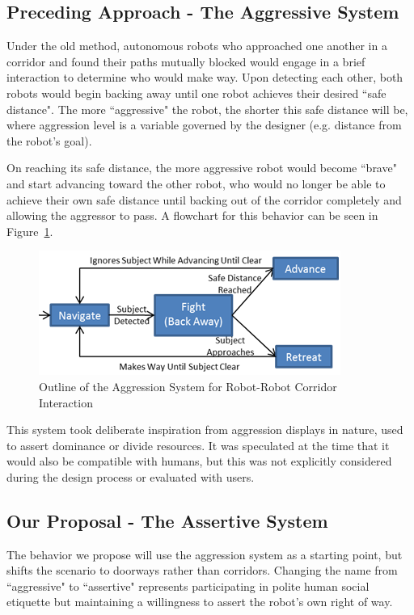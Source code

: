 \documentclass[letterpaper, 10 pt, conference]{ieeeconf}  %
\begin{document}
\subsection{Preceding Approach - The Aggressive System}

Under the old method\cite{c1}, autonomous robots who approached one another in a corridor and found their paths mutually blocked would engage in a brief interaction to determine who would make way. Upon detecting each other, both robots would begin backing away until one robot achieves their desired ``safe distance". The more ``aggressive" the robot, the shorter this safe distance will be, where aggression level is a variable governed by the designer (e.g. distance from the robot’s goal).

On reaching its safe distance, the more aggressive robot would become ``brave" and start advancing toward the other robot, who would no longer be able to achieve their own safe distance until backing out of the corridor completely and allowing the aggressor to pass. A flowchart for this behavior can be seen in Figure~\ref{fig:Aggressive}.
 
    \begin{figure}
      \centering
      \includegraphics{aggressive_behavior.png}
      \caption{Outline of the Aggression System for Robot-Robot Corridor Interaction}
      \label{fig:Aggressive}
   \end{figure}
 
This system took deliberate inspiration from aggression displays in nature, used to assert dominance or divide resources. It was speculated at the time that it would also be compatible with humans, but this was not explicitly considered during the design process or evaluated with users. 


\subsection{Our Proposal - The Assertive System}

The behavior we propose will use the aggression system as a starting point, but shifts the scenario to doorways rather than corridors. Changing the name from ``aggressive" to ``assertive" represents participating in polite human social etiquette but maintaining a willingness to assert the robot’s own right of way.
\end{document}
